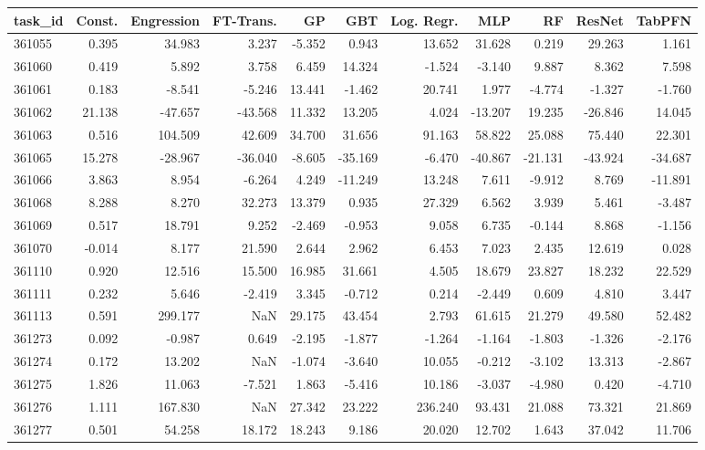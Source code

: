 \begin{tabular}{lrrrrrrrrrr}
\toprule
task\_id & Const. & Engression & FT-Trans. & GP & GBT & Log. Regr. & MLP & RF & ResNet & TabPFN \\
\midrule
361055 & 0.395 & 34.983 & 3.237 & -5.352 & 0.943 & 13.652 & 31.628 & 0.219 & 29.263 & 1.161 \\
361060 & 0.419 & 5.892 & 3.758 & 6.459 & 14.324 & -1.524 & -3.140 & 9.887 & 8.362 & 7.598 \\
361061 & 0.183 & -8.541 & -5.246 & 13.441 & -1.462 & 20.741 & 1.977 & -4.774 & -1.327 & -1.760 \\
361062 & 21.138 & -47.657 & -43.568 & 11.332 & 13.205 & 4.024 & -13.207 & 19.235 & -26.846 & 14.045 \\
361063 & 0.516 & 104.509 & 42.609 & 34.700 & 31.656 & 91.163 & 58.822 & 25.088 & 75.440 & 22.301 \\
361065 & 15.278 & -28.967 & -36.040 & -8.605 & -35.169 & -6.470 & -40.867 & -21.131 & -43.924 & -34.687 \\
361066 & 3.863 & 8.954 & -6.264 & 4.249 & -11.249 & 13.248 & 7.611 & -9.912 & 8.769 & -11.891 \\
361068 & 8.288 & 8.270 & 32.273 & 13.379 & 0.935 & 27.329 & 6.562 & 3.939 & 5.461 & -3.487 \\
361069 & 0.517 & 18.791 & 9.252 & -2.469 & -0.953 & 9.058 & 6.735 & -0.144 & 8.868 & -1.156 \\
361070 & -0.014 & 8.177 & 21.590 & 2.644 & 2.962 & 6.453 & 7.023 & 2.435 & 12.619 & 0.028 \\
361110 & 0.920 & 12.516 & 15.500 & 16.985 & 31.661 & 4.505 & 18.679 & 23.827 & 18.232 & 22.529 \\
361111 & 0.232 & 5.646 & -2.419 & 3.345 & -0.712 & 0.214 & -2.449 & 0.609 & 4.810 & 3.447 \\
361113 & 0.591 & 299.177 & NaN & 29.175 & 43.454 & 2.793 & 61.615 & 21.279 & 49.580 & 52.482 \\
361273 & 0.092 & -0.987 & 0.649 & -2.195 & -1.877 & -1.264 & -1.164 & -1.803 & -1.326 & -2.176 \\
361274 & 0.172 & 13.202 & NaN & -1.074 & -3.640 & 10.055 & -0.212 & -3.102 & 13.313 & -2.867 \\
361275 & 1.826 & 11.063 & -7.521 & 1.863 & -5.416 & 10.186 & -3.037 & -4.980 & 0.420 & -4.710 \\
361276 & 1.111 & 167.830 & NaN & 27.342 & 23.222 & 236.240 & 93.431 & 21.088 & 73.321 & 21.869 \\
361277 & 0.501 & 54.258 & 18.172 & 18.243 & 9.186 & 20.020 & 12.702 & 1.643 & 37.042 & 11.706 \\

\end{tabular}
